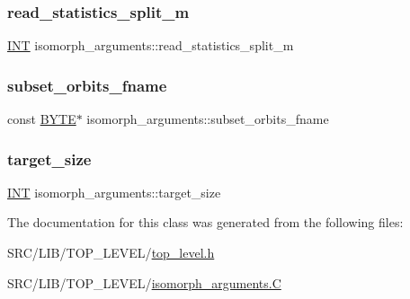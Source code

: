 \mbox{\label{classisomorph__arguments_a9d5765ea9185a3a0b2d889bc66abf437}} 
\subsubsection{\texorpdfstring{read\+\_\+statistics\+\_\+split\+\_\+m}{read\_statistics\_split\_m}}
{\footnotesize\ttfamily \mbox{\hyperlink{galois_8h_a09fddde158a3a20bd2dcadb609de11dc}{I\+NT}} isomorph\+\_\+arguments\+::read\+\_\+statistics\+\_\+split\+\_\+m}

\mbox{\label{classisomorph__arguments_a30e47a55f38788f685d63ad87141e179}} 
\subsubsection{\texorpdfstring{subset\+\_\+orbits\+\_\+fname}{subset\_orbits\_fname}}
{\footnotesize\ttfamily const \mbox{\hyperlink{galois_8h_ab6cc7b4aeb6ea31aba2b3fbfc83ff5e6}{B\+Y\+TE}}$\ast$ isomorph\+\_\+arguments\+::subset\+\_\+orbits\+\_\+fname}

\mbox{\label{classisomorph__arguments_a3a5cd2be7246c5c8e329e432621a557b}} 
\subsubsection{\texorpdfstring{target\+\_\+size}{target\_size}}
{\footnotesize\ttfamily \mbox{\hyperlink{galois_8h_a09fddde158a3a20bd2dcadb609de11dc}{I\+NT}} isomorph\+\_\+arguments\+::target\+\_\+size}



The documentation for this class was generated from the following files\+:\begin{DoxyCompactItemize}
\item 
S\+R\+C/\+L\+I\+B/\+T\+O\+P\+\_\+\+L\+E\+V\+E\+L/\mbox{\hyperlink{top__level_8h}{top\+\_\+level.\+h}}\item 
S\+R\+C/\+L\+I\+B/\+T\+O\+P\+\_\+\+L\+E\+V\+E\+L/\mbox{\hyperlink{isomorph__arguments_8_c}{isomorph\+\_\+arguments.\+C}}\end{DoxyCompactItemize}
